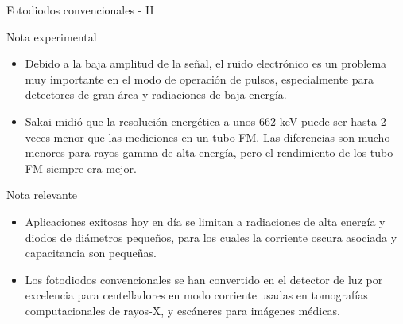 \documentclass[a4paper,10pt]{beamer}
\begin{document}
\begin{frame}{Fotodiodos convencionales - II}
 
 \begin{exampleblock}{Nota experimental}
  
  \begin{itemize}
   \item \begin{justify}
          Debido a la baja amplitud de la señal, el ruido electrónico es un problema 
          muy importante en el modo de operación de pulsos, especialmente para detectores 
          de gran área y radiaciones de baja energía.
         \end{justify}
    \item \begin{justify}
          Sakai midió que la resolución energética a unos 662 keV puede ser hasta 2 veces menor que 
          las mediciones en un tubo FM. Las diferencias son mucho menores para rayos 
          gamma de alta energía, pero el rendimiento de los tubo FM siempre era mejor.
         \end{justify}
  \end{itemize}  
 \end{exampleblock}

 \begin{block}{Nota relevante}
 \begin{itemize}
  \item \begin{justify}
          Aplicaciones exitosas hoy en día se limitan a radiaciones de alta energía 
          y diodos de diámetros pequeños, para los cuales la corriente oscura asociada 
          y capacitancia son pequeñas.
         \end{justify}
 \item  \begin{justify}
          Los fotodiodos convencionales se han convertido en el detector de luz
          por excelencia para centelladores en modo corriente usadas en tomografías 
          computacionales de rayos-X, y escáneres para imágenes médicas.
         \end{justify}
 \end{itemize}
 \end{block}
\end{frame}
\end{document}
